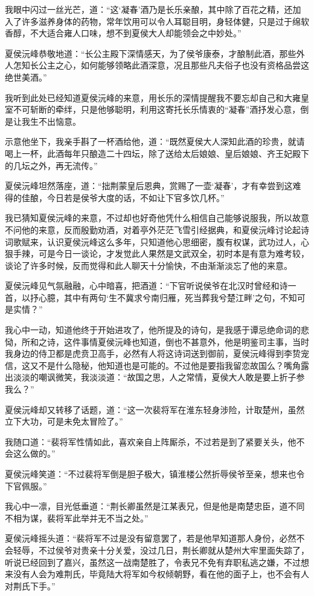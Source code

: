 我眼中闪过一丝光芒，道：“这‘凝春’酒乃是长乐亲酿，其中除了百花之精，还加入了许多滋养身体的药物，常年饮用可以令人耳聪目明，身轻体健，只是过于绵软香醇，不大适合雍人口味，想不到夏侯大人却能领会之中妙处。”

夏侯沅峰恭敬地道：“长公主殿下深情感天，为了侯爷康泰，才酿制此酒，那些外人怎知长公主之心，如何能够领略此酒深意，况且那些凡夫俗子也没有资格品尝这绝世美酒。”

我听到此处已经知道夏侯沅峰的来意，用长乐的深情提醒我不要忘却自己和大雍皇室不可斩断的牵绊，只是他够聪明，利用这寄托长乐情衷的“凝春”酒抒发心意，倒是让我生不出恼意。

示意他坐下，我亲手斟了一杯酒给他，道：“既然夏侯大人深知此酒的珍贵，就请喝上一杯，此酒每年只酿造二十四坛，除了送给太后娘娘、皇后娘娘、齐王妃殿下的几坛之外，再无流传。”

夏侯沅峰坦然落座，道：“拙荆蒙皇后恩典，赏赐了一壶‘凝春’，才有幸尝到这难得的佳酿，今日若是侯爷大度的话，不如让下官多饮几杯。”

我已猜知夏侯沅峰的来意，不过却也好奇他凭什么相信自己能够说服我，所以故意不问他的来意，反而殷勤劝酒，对着亭外茫茫飞雪引经据典，和夏侯沅峰讨论起诗词歌赋来，认识夏侯沅峰这么多年，只知道他心思细密，腹有权谋，武功过人，心狠手辣，可是今日一谈论，才发觉此人果然是文武双全，初时本是有意为难考较，谈论了许多时候，反而觉得和此人聊天十分愉快，不由渐渐淡忘了他的来意。

夏侯沅峰见气氛融融，心中暗喜，把酒道：“下官听说侯爷在北汉时曾经和诗一首，以抒心臆，其中有两句‘生不冀求兮南归雁，死当葬我兮楚江畔’之句，不知可是实情？”

我心中一动，知道他终于开始进攻了，他所提及的诗句，是我感于谭忌绝命词的悲恸，所和之诗，这件事情夏侯沅峰也知道，倒也不甚意外，他是明鉴司主事，当时我身边的侍卫都是虎贲卫高手，必然有人将这诗词送到御前，夏侯沅峰得到李贽宠信，这又不是什么隐秘，他知道也是可能的。不过他是要指我留恋故国么？嘴角露出淡淡的嘲讽微笑，我淡淡道：“故国之思，人之常情，夏侯大人敢是要上折子参我么？”

夏侯沅峰却又转移了话题，道：“这一次裴将军在淮东轻身涉险，计取楚州，虽然立下大功，可是未免太冒险了。”

我随口道：“裴将军性情如此，喜欢亲自上阵厮杀，不过若是到了紧要关头，他不会这么做的。”

夏侯沅峰笑道：“不过裴将军倒是胆子极大，镇淮楼公然折辱侯爷至亲，想来也令下官佩服。”

我心中一凛，目光低垂道：“荆长卿虽然是江某表兄，但是他是南楚忠臣，道不同不相为谋，裴将军此举并无不当之处。”

夏侯沅峰摇头道：“裴将军不过是没有留意罢了，若是他早知道那人身份，必然不会轻辱，不过侯爷对贵亲十分关爱，没过几日，荆长卿就从楚州大牢里面失踪了，听说已经回到了嘉兴，虽然这一战南楚胜了，令表兄不免有弃职私逃之嫌，不过想来没有人会为难荆氏，毕竟陆大将军如今权倾朝野，看在他的面子上，也不会有人对荆氏下手。”

